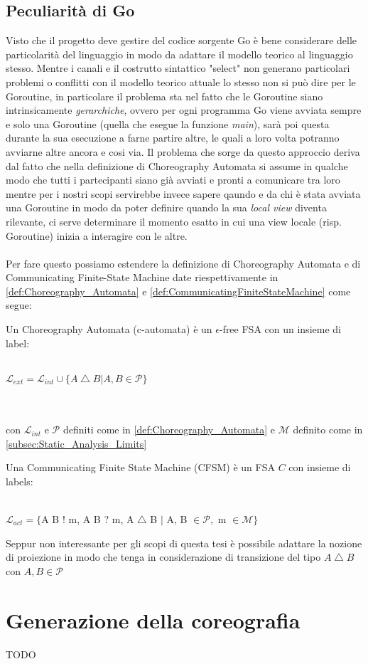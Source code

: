 \subsection{Peculiarità di Go}
Visto che il progetto deve gestire del codice sorgente Go è bene considerare delle particolarità del linguaggio in modo da adattare il modello teorico al linguaggio stesso.
Mentre i canali e il costrutto sintattico "select" non generano particolari problemi o conflitti con il modello teorico attuale lo stesso non si può dire per le Goroutine, in particolare il problema sta nel fatto che le Goroutine siano intrinsicamente \emph{gerarchiche}, ovvero per ogni programma Go viene avviata sempre e solo una Goroutine (quella che esegue la funzione \emph{main}), sarà poi questa durante la sua esecuzione a farne partire altre, le quali a loro volta potranno avviarne altre ancora e cosi via.
Il problema che sorge da questo approccio deriva dal fatto che nella definizione di Choreography Automata si assume in qualche modo che tutti i partecipanti siano già avviati e pronti a comunicare tra loro mentre per i nostri scopi servirebbe invece sapere qaundo e da chi è stata avviata una Goroutine in modo da poter definire quando la sua \emph{local view} diventa rilevante, ci serve determinare il momento esatto in cui una view locale (risp. Goroutine) inizia a interagire con le altre.\\ \\
Per fare questo possiamo estendere la definizione di Choreography Automata e di Communicating Finite-State Machine date riespettivamente in \ref{def:Choreography_Automata} e \ref{def:CommunicatingFiniteStateMachine} come segue:

\begin{definition}
    Un Choreography Automata (c-automata) è un $\epsilon$-free FSA con un insieme di label:\\ \\
    \centerline{$\mathcal{L}_{ext} = \mathcal{L}_{int} \cup \{ A \bigtriangleup B | A, B \in \mathcal{P}\}$}\\ \\
    con $\mathcal{L}_{int}$ e $\mathcal{P}$ definiti come in \ref{def:Choreography_Automata} e $\mathcal{M}$ definito come in \ref{subsec:Static_Analysis_Limits}
\end{definition}

\begin{definition}
    Una Communicating Finite State Machine (CFSM) è un FSA $C$ con insieme di labels:
    \\ \\
    \centerline{$\mathcal{L}_{act} = \{$A B ! m, A B ? m, A $\bigtriangleup$ B $|$ A, B $ \in \mathcal{P},$ m $ \in \mathcal{M}\}$}
\end{definition}

\begin{remark}
    Seppur non interessante per gli scopi di questa tesi è possibile adattare la nozione di proiezione in modo che tenga in considerazione di transizione del tipo $A \bigtriangleup B$ con $A, B \in \mathcal{P}$
\end{remark}

\section{Generazione della coreografia}
TODO %
